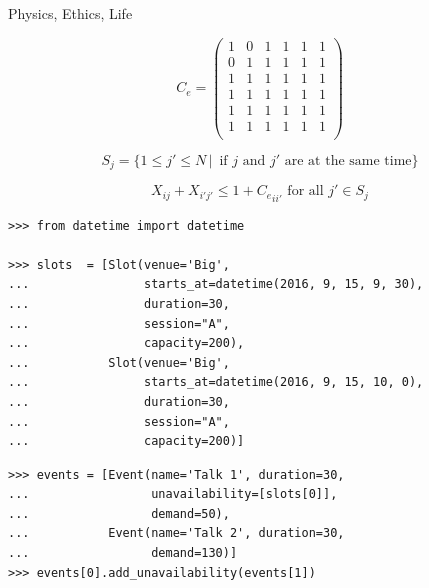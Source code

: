 \documentclass{beamer}
\begin{document}
    \begin{frame}
        \Huge
        \begin{center}
            Physics, Ethics, Life
        \end{center}
    \end{frame}

    \begin{frame}
        \Large  
        \[
            C_e = 
            \begin{pmatrix}
                1 & 0 & 1 & 1 & 1 & 1 \\
                0 & 1 & 1 & 1 & 1 & 1 \\
                1 & 1 & 1 & 1 & 1 & 1 \\
                1 & 1 & 1 & 1 & 1 & 1 \\
                1 & 1 & 1 & 1 & 1 & 1 \\
                1 & 1 & 1 & 1 & 1 & 1 \\
            \end{pmatrix}
        \]
        
        \[
   S_j = \{1\leq j'\leq N\,|\,\text{ if }j\text{ and }j'\text{ are at the same time}\}
        \]

        \normalsize
        \[
        X_{ij}  + X_{i'j'} \leq 1 + {C_{e}}_{ii'}\text{ for all }j'\in S_j      
        \]
    \end{frame}

    \begin{frame}[fragile]{}
        \begin{verbatim}
>>> from datetime import datetime

>>> slots  = [Slot(venue='Big', 
...                starts_at=datetime(2016, 9, 15, 9, 30), 
...                duration=30, 
...                session="A", 
...                capacity=200),
...           Slot(venue='Big', 
...                starts_at=datetime(2016, 9, 15, 10, 0), 
...                duration=30, 
...                session="A", 
...                capacity=200)]

        \end{verbatim}
\end{frame}

    \begin{frame}[fragile]{}
        \begin{verbatim}
>>> events = [Event(name='Talk 1', duration=30, 
...                 unavailability=[slots[0]], 
...                 demand=50),
...           Event(name='Talk 2', duration=30, 
...                 demand=130)]
>>> events[0].add_unavailability(events[1])

        \end{verbatim}
\end{frame}
\end{document}
